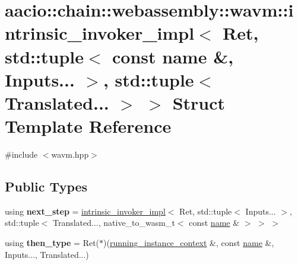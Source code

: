 \hypertarget{structaacio_1_1chain_1_1webassembly_1_1wavm_1_1intrinsic__invoker__impl_3_01_ret_00_01std_1_1tupd2828f96960a3f33dc0ab5c4ff6055a9}{}\section{aacio\+:\+:chain\+:\+:webassembly\+:\+:wavm\+:\+:intrinsic\+\_\+invoker\+\_\+impl$<$ Ret, std\+:\+:tuple$<$ const name \&, Inputs... $>$, std\+:\+:tuple$<$ Translated... $>$ $>$ Struct Template Reference}
\label{structaacio_1_1chain_1_1webassembly_1_1wavm_1_1intrinsic__invoker__impl_3_01_ret_00_01std_1_1tupd2828f96960a3f33dc0ab5c4ff6055a9}


{\ttfamily \#include $<$wavm.\+hpp$>$}

\subsection*{Public Types}
\begin{DoxyCompactItemize}
\item 
\mbox{\label{structaacio_1_1chain_1_1webassembly_1_1wavm_1_1intrinsic__invoker__impl_3_01_ret_00_01std_1_1tupd2828f96960a3f33dc0ab5c4ff6055a9_aa11b2df91f27747f58253507f7f23ae7}} 
using {\bfseries next\+\_\+step} = \mbox{\hyperlink{structaacio_1_1chain_1_1webassembly_1_1wavm_1_1intrinsic__invoker__impl}{intrinsic\+\_\+invoker\+\_\+impl}}$<$ Ret, std\+::tuple$<$ Inputs... $>$, std\+::tuple$<$ Translated..., native\+\_\+to\+\_\+wasm\+\_\+t$<$ const \mbox{\hyperlink{structaacio_1_1chain_1_1name}{name}} \& $>$ $>$ $>$
\item 
\mbox{\label{structaacio_1_1chain_1_1webassembly_1_1wavm_1_1intrinsic__invoker__impl_3_01_ret_00_01std_1_1tupd2828f96960a3f33dc0ab5c4ff6055a9_a4346d5f443e6e2eb445b4231e6862c7d}} 
using {\bfseries then\+\_\+type} = Ret($\ast$)(\mbox{\hyperlink{structaacio_1_1chain_1_1webassembly_1_1wavm_1_1running__instance__context}{running\+\_\+instance\+\_\+context}} \&, const \mbox{\hyperlink{structaacio_1_1chain_1_1name}{name}} \&, Inputs..., Translated...)
\end{DoxyCompactItemize}
